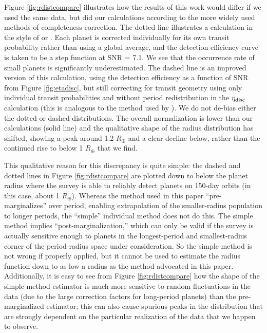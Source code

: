 \documentclass[iop]{emulateapj}
\def\Rearth{R_\oplus}
\begin{document}
Figure \ref{fig:rdistcompare} illustrates how the results of this work would differ if we used the same data, but did our calculations according to the more widely used methods of completeness correction.  The dotted line illustrates a calculation in the style of \citet{dressing2013} or \citet{howard2012}.  Each planet is corrected individually for its own transit probability rather than using a global average, and the detection efficiency curve is taken to be a step function at SNR = 7.1.  We see that the occurrence rate of small planets is significantly underestimated.  The dashed line is an improved version of this calculation, using the detection efficiency as a function of SNR from Figure \ref{fig:etadisc}, but still correcting for transit geometry using only individual transit probabilities and without period redistribution in the $\eta_{\rm disc}$ calculation (this is analogous to the method used by \citet{petigura2013b}).  We do not de-bias either the dotted or dashed distributions.  The overall normalization is lower than our calculations (solid line) and the qualitative shape of the radius distribution has shifted, showing a peak around 1.2 $\Rearth$ and a clear decline below, rather than the continued rise to below 1 $\Rearth$ that we find.  

This qualitative reason for this discrepancy is quite simple:  the dashed and dotted lines in Figure \ref{fig:rdistcompare} are plotted down to below the planet radius where the survey is able to reliably detect planets on 150-day orbits (in this case, about 1 $\Rearth$).  Whereas the method used in this paper ``pre-marginalizes'' over period, enabling extrapolation of the smaller-radius population to longer periods, the ``simple'' individual method does not do this.  The simple method implies ``post-marginalization,'' which can only be valid if the survey is actually sensitive enough to planets in the longest-period and smallest-radius corner of the period-radius space under consideration.  So the simple method is not wrong if properly applied, but it cannot be used to estimate the radius function down to as low a radius as the method advocated in this paper.  Additionally, it is easy to see from Figure \ref{fig:rdistcompare} how the shape of the simple-method estimator is much more sensitive to random fluctuations in the data (due to the large correction factors for long-period planets) than the pre-marginalized estimator; this can also cause spurious peaks in the distribution that are strongly dependent on the particular realization of the data that we happen to observe.
\end{document}
